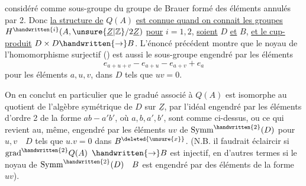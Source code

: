 considéré comme sous-groupe du groupe de Brauer formé des éléments annulés par 2. Donc \uline{la structure de} $Q(A)$ \uline{est connue quand on connait les groupes} $H^{\handwritten{i}}(A,\unsure{\underline{Z}|\mathbb{Z}}/2\underline{Z})$ \uline{pour} $i=1,2$, \uline{soient} $D$ \uline{et} $B$, \uline{et le cup-produit} $D\times D\handwritten{\to}B$. L'énoncé précédent montre  que le noyau de l'homomorphisme surjectif (\handwritten{*}) est aussi le sous-groupe engendré par les éléments
\[
e_{a+u+v}-e_{a+u}-e_{a+v}+e_a
\]
pour les éléments $a,u,v$, dans $D$ tels que $uv=0$.

On en conclut en particulier que le gradué associé à $Q(A)$ est isomorphe au quotient de l'algèbre symétrique de $D$ sur $\underline{Z}$, par  l'idéal engendré par les éléments d'ordre 2 de la forme $ab-a'b'$, où $a,b,a',b'$, sont comme ci-dessus, ou ce qui revient au, même, engendré par les éléments $uv$ de $\mathrm{Symm}^{\handwritten{2}}(D)$ pour $u,v\quad D$ tels que $u.v=0$ dans $B^{\deleted{\unsure{x}}}$. (N.B. il faudrait éclaircir si $\mathrm{grad}^{\handwritten{2}}Q(A)$  $\handwritten{\to}B$ est  injectif, en d'autres termes si le noyau de $\mathrm{Symm}^{\handwritten{2}}(D)\quad B$ est engendré par des éléments de la forme  $uv$).

